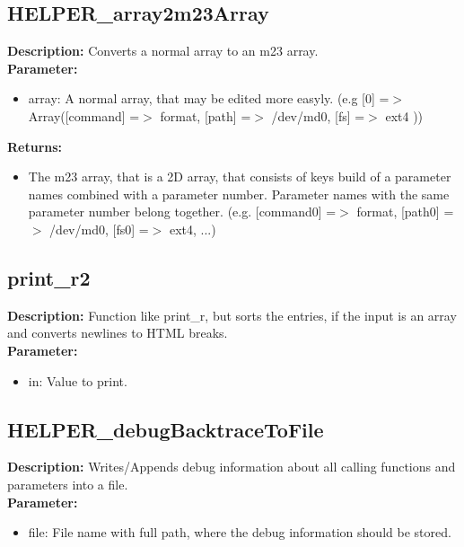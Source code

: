 \subsection{HELPER\_array2m23Array}
\textbf{Description:} Converts a normal array to an m23 array.\\
\textbf{Parameter:}
\begin{itemize}
\item array: A normal array, that may be edited more easyly. (e.g [0] =$>$ Array([command] =$>$ format, [path] =$>$ /dev/md0, [fs] =$>$ ext4 ))
\end{itemize}
\textbf{Returns:}
\begin{itemize}
\item The m23 array, that is a 2D array, that consists of keys build of a parameter names combined with a parameter number. Parameter names with the same parameter number belong together. (e.g. [command0] =$>$ format, [path0] =$>$ /dev/md0, [fs0] =$>$ ext4, ...)
\end{itemize}

\subsection{print\_r2}
\textbf{Description:} Function like print\_r, but sorts the entries, if the input is an array and converts newlines to HTML breaks.\\
\textbf{Parameter:}
\begin{itemize}
\item in: Value to print.
\end{itemize}

\subsection{HELPER\_debugBacktraceToFile}
\textbf{Description:} Writes/Appends debug information about all calling functions and parameters into a file.\\
\textbf{Parameter:}
\begin{itemize}
\item file: File name with full path, where the debug information should be stored.
\end{itemize}


